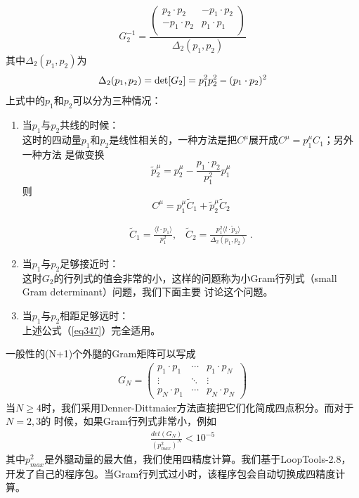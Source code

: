 \begin{equation}
G_2^{-1}= \frac{\left( \begin{array}{cc}  p_2\cdot p_2 & - p_1 \cdot p_2 \\
                           - p_1\cdot p_2 &  p_1 \cdot p_1 \\
                         \end{array}\right)}{\Delta_2(p_1,p_2)}
\end{equation}
其中$\Delta_2(p_1,p_2)$为
\begin{eqnarray}
\Delta_2(p_1,p_2)
={\rm det}[ G_2 ] = p_1^2 p_2^2 -(p_1 \cdot p_2)^2
\end{eqnarray}
上式中的$p_1$和$p_2$可以分为三种情况：
\begin{enumerate}
\item 当$p_1$与$p_2$共线的时候：\\
这时的四动量$p_1$和$p_2$是线性相关的，一种方法是把$C^{\mu}$展开成$C^{\mu} = p^{\mu}_1 C_1$；另外一种方法
是做变换
\begin{equation} 
\tilde p_2^{\mu} = p_2^\mu  
- \frac{p_1 \cdot p_2}{p_1^2} p_1^{\mu}
\end{equation}
则
\begin{equation}
C^{\mu} 
= p_1^\mu {\tilde C}_1 + \tilde p_2^{\mu} {\tilde C}_2
\label{eq457}
\end{equation}

\begin{equation} 
\begin{split} 
{\tilde C}_1 = \frac{\langle l \cdot p_1 \rangle }{p_1^2},
\;\;\;
{\tilde C}_2 = 
\frac{p_1^2 \langle l \cdot \tilde p_2 \rangle}{\Delta_2(p_1,p_2)}\;. 
\label{tildec2}
\end{split} 
\end{equation}

\item 当$p_1$与$p_2$足够接近时：\\
这时$G_2$的行列式的值会非常的小，这样的问题称为小Gram行列式（small Gram determinant）问题，我们下面主要
讨论这个问题。

\item 当$p_1$与$p_2$相距足够远时：\\
上述公式（\ref{eq347}）完全适用。
\end{enumerate}

一般性的(N+1)个外腿的Gram矩阵可以写成
\begin{eqnarray}
G_N = \left(\begin{array}{ccc} p_1\cdot p_1 & \cdots & p_1\cdot p_N \\
\vdots & \ddots & \vdots \\
p_N\cdot p_1 & \cdots & p_N\cdot p_N
\end{array}\right)
\end{eqnarray}
当$N\ge 4$时，我们采用Denner-Dittmaier方法\cite{DDreduction}直接把它们化简成四点积分。而对于$N=2,3$的
时候，如果Gram行列式非常小，例如
\begin{eqnarray}
\frac{det(G_N)}{(p^2_{max})^N} < 10^{-5}
\end{eqnarray}
其中$p^2_{max}$是外腿动量的最大值，我们使用四精度计算\cite{quadcompute}。我们基于LoopTools-2.8，
开发了自己的程序包。当Gram行列式过小时，该程序包会自动切换成四精度计算。


